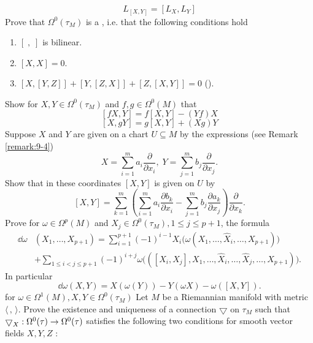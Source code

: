 \begin{enumerate}[\theexercise.1]
    \[
      {L}_{[  X,Y]  } = [  {{L}_{X},{L}_{Y}}]
    \]
    Prove that ${\Omega }^{0}( {\tau }_{M})$ is a , i.e. that the following conditions hold
    \begin{enumerate}
      \item[(L1)] $[  {\;,\;}]$ is bilinear.
      \item[(L2)] $[  {X,X}] = 0$.
      \item[(L3)] $[  {X,[  {Y,Z}]  }]   + [  {Y,[  {Z,X}]  }]   + [  {Z,[  {X,Y}]  }] = 0$ ().
    \end{enumerate}
    Show for $X,Y \in  {\Omega }^{0}( {\tau }_{M})$ and $f,g \in  {\Omega }^{0}( M)$ that
    \[
      [  {{fX},Y}]   = f[  {X,Y}]  - ( {Yf}) X
    \]
    \[
      [  {X,{gY}}]   = g[  {X,Y}]   + ( {Xg}) Y
    \]
    Suppose $X$ and $Y$ are given on a chart $U \subseteq  M$ by the expressions (see Remark \ref{remark:9-4})
    \[
      X = \sum_{i=1}^{m}{a}_{i}\frac{\partial }{\partial {x}_{i}},\;Y = \sum_{{j = 1}}^{m}{b}_{j}\frac{\partial }{\partial {x}_{j}}.
    \]
    Show that in these coordinates $[  {X,Y}]$ is given on $U$ by
    \[
      [  {X,Y}]   = \sum_{{k = 1}}^{m}\left( {\sum_{i=1}^{m}{a}_{i}\frac{\partial {b}_{k}}{\partial {x}_{i}}- \sum_{{j = 1}}^{m}{b}_{j}\frac{\partial {a}_{k}}{\partial {x}_{j}}}\right) \frac{\partial }{\partial {x}_{k}}.
    \]
  \NewItem Prove for $\omega  \in  {\Omega }^{p}( M)$ and ${X}_{j} \in  {\Omega }^{0}( {\tau }_{M}),1 \leq  j \leq  p + 1$, the formula
    \[
      \begin{aligned}
        {\dd\omega } & ( {{X}_{1},\ldots,{X}_{p + 1}})  
          = \sum_{i=1}^{{p + 1}}{(-1) }^{i- 1}{X}_{i}\big( {\omega ( {{X}_{1},\ldots,{\widehat{X}}_{i},\ldots,{X}_{p + 1}}) }\big)\\
        & + \sum_{{1 \leq  i < j \leq  p + 1}}{(-1) }^{i + j}\omega \big( ( {[  {{X}_{i},{X}_{j}}] ,{X}_{1},\ldots,{\widehat{X}}_{i},\ldots,{\widehat{X}}_{j},\ldots,{X}_{p + 1}}) \big).
      \end{aligned}
    \]
    In particular
    \[
      {\dd\omega }( {X,Y})  = X( {\omega ( Y) }) - Y( {\omega X}) - \omega ( [  {X,Y}]  ).
    \]
    for $\omega  \in  {\Omega }^{1}( M),X,Y \in  {\Omega }^{0}( {\tau }_{M})$
  \NewItem Let $M$ be a Riemannian manifold with metric $\langle\,,\,\rangle$. Prove the existence and uniqueness of a connection $\bigtriangledown$ on ${\tau }_{M}$ such that ${ \bigtriangledown  }_{X} : {\Omega }^{0}( \tau )  \rightarrow  {\Omega }^{0}( \tau )$ satisfies the following two conditions for smooth vector fields $X,Y,Z$ :

\end{enumerate}
